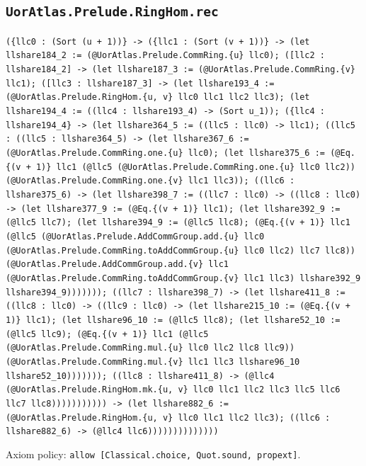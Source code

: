 \documentclass[11pt]{article}
\begin{document}
\subsection*{\texttt{UorAtlas.Prelude.RingHom.rec}}
\noindent\texttt{(\{llc0 : (Sort (u + 1))\} -> (\{llc1 : (Sort (v + 1))\} -> (let llshare184\_2 := (@UorAtlas.Prelude.CommRing.\{u\} llc0); ([llc2 : llshare184\_2] -> (let llshare187\_3 := (@UorAtlas.Prelude.CommRing.\{v\} llc1); ([llc3 : llshare187\_3] -> (let llshare193\_4 := (@UorAtlas.Prelude.RingHom.\{u, v\} llc0 llc1 llc2 llc3); (let llshare194\_4 := ((llc4 : llshare193\_4) -> (Sort u\_1)); (\{llc4 : llshare194\_4\} -> (let llshare364\_5 := ((llc5 : llc0) -> llc1); ((llc5 : ((llc5 : llshare364\_5) -> (let llshare367\_6 := (@UorAtlas.Prelude.CommRing.one.\{u\} llc0); (let llshare375\_6 := (@Eq.\{(v + 1)\} llc1 (@llc5 (@UorAtlas.Prelude.CommRing.one.\{u\} llc0 llc2)) (@UorAtlas.Prelude.CommRing.one.\{v\} llc1 llc3)); ((llc6 : llshare375\_6) -> (let llshare398\_7 := ((llc7 : llc0) -> ((llc8 : llc0) -> (let llshare377\_9 := (@Eq.\{(v + 1)\} llc1); (let llshare392\_9 := (@llc5 llc7); (let llshare394\_9 := (@llc5 llc8); (@Eq.\{(v + 1)\} llc1 (@llc5 (@UorAtlas.Prelude.AddCommGroup.add.\{u\} llc0 (@UorAtlas.Prelude.CommRing.toAddCommGroup.\{u\} llc0 llc2) llc7 llc8)) (@UorAtlas.Prelude.AddCommGroup.add.\{v\} llc1 (@UorAtlas.Prelude.CommRing.toAddCommGroup.\{v\} llc1 llc3) llshare392\_9 llshare394\_9))))))); ((llc7 : llshare398\_7) -> (let llshare411\_8 := ((llc8 : llc0) -> ((llc9 : llc0) -> (let llshare215\_10 := (@Eq.\{(v + 1)\} llc1); (let llshare96\_10 := (@llc5 llc8); (let llshare52\_10 := (@llc5 llc9); (@Eq.\{(v + 1)\} llc1 (@llc5 (@UorAtlas.Prelude.CommRing.mul.\{u\} llc0 llc2 llc8 llc9)) (@UorAtlas.Prelude.CommRing.mul.\{v\} llc1 llc3 llshare96\_10 llshare52\_10))))))); ((llc8 : llshare411\_8) -> (@llc4 (@UorAtlas.Prelude.RingHom.mk.\{u, v\} llc0 llc1 llc2 llc3 llc5 llc6 llc7 llc8))))))))))) -> (let llshare882\_6 := (@UorAtlas.Prelude.RingHom.\{u, v\} llc0 llc1 llc2 llc3); ((llc6 : llshare882\_6) -> (@llc4 llc6))))))))))))))}\par
\noindent Axiom policy: \texttt{allow [Classical.choice, Quot.sound, propext]}.\par
\end{document}
